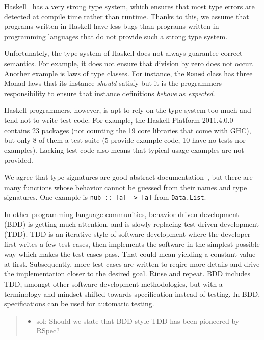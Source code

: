 \documentclass[preprint]{sigplanconf}
\begin{document}

Haskell~\cite{haskell} has a very strong type system, which ensures that most type errors are
detected at compile time rather than runtime.  Thanks to this, we assume that
programs written in Haskell have less bugs than programs written in programming
languages that do not provide such a strong type system.

Unfortunately, the type system of Haskell does not always guarantee
correct semantics.
For example, it does not ensure that division by zero does not occur.
Another example is laws of type classes.
For instance, the {\tt Monad} class has three Monad laws
that its instance \emph{should} satisfy
but
it is the programmers responsibility to ensure that
instance definitions \emph{behave} as \emph{expected}.

Haskell programmers, however, is apt to rely on the type system too
much and tend not to write test code.  For example, the Haskell
Platform 2011.4.0.0 contains 23 packages (not counting the 19 core
libraries that come with GHC), but only 8 of them a test suite (5
provide example code, 10 have no tests nor examples).  Lacking test
code also means that typical usage examples are not provided.

We agree that type signatures are good abstract documentation~\cite{free}, but
there are many functions whose behavior cannot be guessed from their names and
type signatures.  One example is \verb|nub :: [a] -> [a]| from {\tt Data.List}.

In other programming language communities, behavior driven development
(BDD) is getting much attention, and is slowly replacing test driven
development (TDD).  TDD is an iterative style of software development
where the developer first writes a few test cases, then implements the
software in the simplest possible way which makes the test cases pass.
That could mean yielding a constant value at first.  Subsequently,
more test cases are written to reqire more details and drive the
implementation closer to the desired goal.  Rinse and repeat.  BDD
includes TDD, amongst other software development methodologies, but
with a terminology and mindset  shifted towards specification instead
of testing.  In BDD, specifications can be used for automatic testing.

\begin{quote}\begin{itemize}
    \item sol: Should we state that BDD-style TDD has been pioneered
        by RSpec?
\end{itemize}\end{quote}
\end{document}
